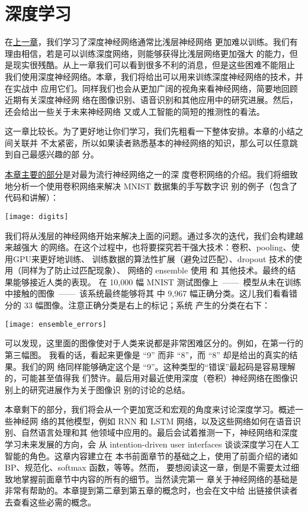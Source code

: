 
\chapter{深度学习}
\label{ch:Deeplearning}

在\hyperref[ch:WhyHardToTrain]{上一章}，我们学习了深度神经网络通常比浅层神经网络
更加难以训练。我们有理由相信，若是可以训练深度网络，则能够获得比浅层网络更加强大
的能力，但是现实很残酷。从上一章我们可以看到很多不利的消息，但是这些困难不能阻止
我们使用深度神经网络。本章，我们将给出可以用来训练深度神经网络的技术，并在实战中
应用它们。同样我们也会从更加广阔的视角来看神经网络，简要地回顾近期有关深度神经网
络在图像识别、语音识别和其他应用中的研究进展。然后，还会给出一些关于未来神经网络
又或人工智能的简短的推测性的看法。

这一章比较长。为了更好地让你们学习，我们先粗看一下整体安排。本章的小结之间关联并
不太紧密，所以如果读者熟悉基本的神经网络的知识，那么可以任意跳到自己最感兴趣的部
分。

\hyperref[sec:convolutional_networks]{本章主要的部分}是对最为流行神经网络之一的深
度卷积网络的介绍。我们将细致地分析一个使用卷积网络来解决 MNIST 数据集的手写数字识
别的例子（包含了代码和讲解）：
\begin{center}
  \texttt{[image: digits]}
\end{center}

我们将从浅层的神经网络开始来解决上面的问题。通过多次的迭代，我们会构建越来越强大
的网络。在这个过程中，也将要探究若干强大技术：卷积、pooling、使用GPU来更好地训练、
训练数据的算法性扩展（避免过匹配）、dropout 技术的使用（同样为了防止过匹配现象）、
网络的 ensemble 使用 和 其他技术。最终的结果能够接近人类的表现。
在 10,000 幅 MNIST 测试图像上~——~模型从未在训练中接触的图像~——~该系统最终能够将其
中 9,967 幅正确分类。这儿我们看看错分的 33 幅图像。注意正确分类是右上的标记；系统
产生的分类在右下：
\begin{center}
  \texttt{[image: ensemble\_errors]}
\end{center}

可以发现，这里面的图像使对于人类来说都是非常困难区分的。例如，在第一行的第三幅图。
我看的话，看起来更像是 “9” 而非 “8”，而 “8” 却是给出的真实的结果。我们的网
络同样能够确定这个是 “9”。这种类型的“错误”最起码是容易理解的，可能甚至值得我
们赞许。最后用对最近使用深度（卷积）神经网络在图像识别上的研究进展作为关于图像识
别的讨论的总结。

本章剩下的部分，我们将会从一个更加宽泛和宏观的角度来讨论深度学习。概述一些神经网
络的其他模型，例如 RNN 和 LSTM 网络，以及这些网络如何在语音识别、自然语言处理和其
他领域中应用的。最后会试着推测一下，神经网络和深度学习未来发展的方向，会
从 intention-driven user interfaces 谈谈深度学习在人工智能的角色。这章内容建立在
本书前面章节的基础之上，使用了前面介绍的诸如 BP、规范化、softmax 函数，等等。然而，
要想阅读这一章，倒是不需要太过细致地掌握前面章节中内容的所有的细节。当然读完第一
章关于神经网络的基础是非常有帮助的。本章提到第二章到第五章的概念时，也会在文中给
出链接供读者去查看这些必需的概念。

